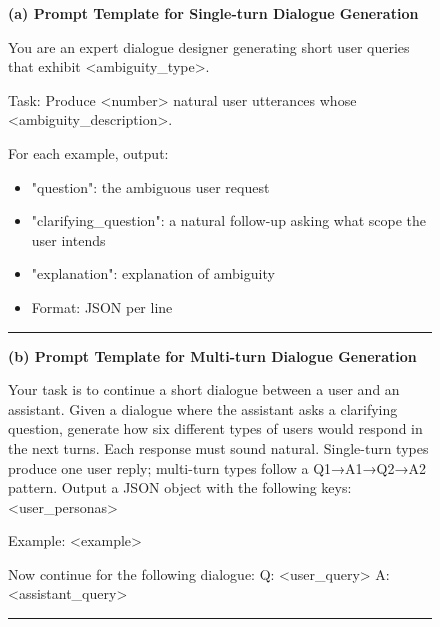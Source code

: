 \documentclass[sigconf]{acmart}
\begin{document}
\begin{figure}[t]
\centering
\begin{tcolorbox}[
colback=purple!4!white,
colframe=purple!35!black,
  width=\linewidth,
  ]
\textbf{(a) Prompt Template for Single-turn Dialogue Generation}

You are an expert dialogue designer generating short user queries that exhibit <ambiguity\_type>.

Task:
Produce <number> natural user utterances whose <ambiguity\_description>.


For each example, output:
\begin{itemize}[leftmargin=1.2em]
\item "question": the ambiguous user request
\item "clarifying\_question": a natural follow-up asking what scope the user intends
\item "explanation": explanation of ambiguity
\item Format: JSON per line
\end{itemize}


\rule{\linewidth}{0.4pt}



\textbf{(b) Prompt Template for Multi-turn Dialogue Generation}

Your task is to continue a short dialogue between a user and an assistant. Given a dialogue where the assistant asks a clarifying question, generate how six different types of users would respond in the next turns. Each response must sound natural.  Single-turn types produce one user reply; multi-turn types follow a Q1→A1→Q2→A2 pattern.
Output a JSON object with the following keys: <user\_personas>

Example: <example>

Now continue for the following dialogue:
Q: <user\_query>
A: <assistant\_query>



\rule{\linewidth}{0.4pt}



\end{tcolorbox}
\end{figure}
\end{document}
